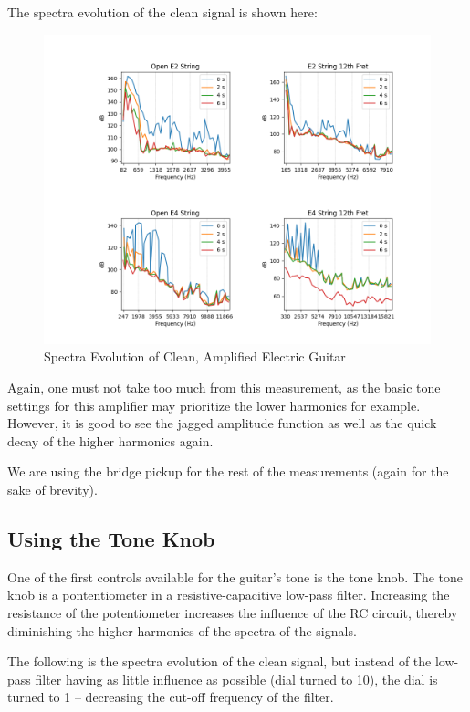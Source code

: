 \documentclass[10pt, a4paper]{article}
\begin{document}
The spectra evolution of the clean signal is shown here:

\begin{figure}[H]
\centering
\caption{Spectra Evolution of Clean, Amplified Electric Guitar}
\includegraphics[scale=0.5]{clean_hvt.png}
\end{figure}

Again, one must not take too much from this measurement, as the basic tone settings for this amplifier may prioritize the lower harmonics for example. However, it is good to see the jagged amplitude function as well as the quick decay of the higher harmonics again.

We are using the bridge pickup for the rest of the measurements (again for the sake of brevity).

\subsection{Using the Tone Knob}
One of the first controls available for the guitar's tone is the tone knob. 
The tone knob is a pontentiometer in a resistive-capacitive low-pass filter. Increasing the resistance of the potentiometer increases the influence of the RC circuit, thereby diminishing the higher harmonics of the spectra of the signals.

The following is the spectra evolution of the clean signal, but instead of the low-pass filter having as little influence as possible (dial turned to 10), the dial is turned to 1 -- decreasing the cut-off frequency of the filter.
\end{document}
